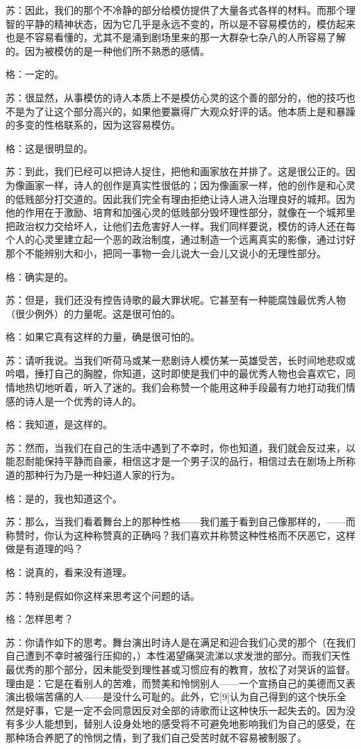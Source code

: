 \documentclass[12pt,oneside]{book}
\begin{document}
苏：因此，我们的那个不冷静的部分给模仿提供了大量各式各样的材料。而那个理智的平静的精神状态，因为它几乎是永远不变的，所以是不容易模仿的，模仿起来也是不容易看懂的，尤其不是涌到剧场里来的那一大群杂七杂八的人所容易了解的。因为被模仿的是一种他们所不熟悉的感情。

格：一定的。

苏：很显然，从事模仿的诗人本质上不是模仿心灵的这个善的部分的，他的技巧也不是为了让这个部分高兴的，如果他要赢得广大观众好评的话。他本质上是和暴躁的多变的性格联系的，因为这容易模仿。

格：这是很明显的。

苏：到此，我们已经可以把诗人捉住，把他和画家放在并排了。这是很公正的。因为像画家一样，诗人的创作是真实性很低的；因为像画家一样，他的创作是和心灵的低贱部分打交道的。因此我们完全有理由拒绝让诗人进入治理良好的城邦。因为他的作用在于激励、培育和加强心灵的低贱部分毁坏理性部分，就像在一个城邦里把政治权力交给坏人，让他们去危害好人一样。我们同样要说，模仿的诗人还在每个人的心灵里建立起一个恶的政治制度，通过制造一个远离真实的影像，通过讨好那个不能辨别大和小，把同一事物一会儿说大一会儿又说小的无理性部分。

格：确实是的。

苏：但是，我们还没有控告诗歌的最大罪状呢。它甚至有一种能腐蚀最优秀人物（很少例外）的力量呢。这是很可怕的。

格：如果它真有这样的力量，确是很可怕的。

苏：请听我说。当我们听荷马或某一悲剧诗人模仿某一英雄受苦，长时间地悲叹或吟唱，捶打自己的胸膛，你知道，这时即使是我们中的最优秀人物也会喜欢它，同情地热切地听着，听入了迷的。我们会称赞一个能用这种手段最有力地打动我们情感的诗人是一个优秀的诗人的。

格：我知道，是这样的。

苏：然而，当我们在自己的生活中遇到了不幸时，你也知道，我们就会反过来，以能忍耐能保持平静而自豪，相信这才是一个男子汉的品行，相信过去在剧场上所称道的那种行为乃是一种妇道人家的行为。

格：是的，我也知道这个。

苏：那么，当我们看着舞台上的那种性格——我们羞于看到自己像那样的，——而称赞时，你认为这种称赞真的正确吗？我们喜欢并称赞这种性格而不厌恶它，这样做是有道理的吗？

格：说真的，看来没有道理。

苏：特别是假如你这样来思考这个问题的话。

格：怎样思考？

苏：你请作如下的思考。舞台演出时诗人是在满足和迎合我们心灵的那个（在我们自己遭到不幸时被强行压抑的，）本性渴望痛哭流涕以求发泄的部分。而我们天性最优秀的那个部分，因未能受到理性甚或习惯应有的教育，放松了对哭诉的监督。理由是：它是在看别人的苦难，而赞美和怜悯别人——一个宣扬自己的美德而又表演出极端苦痛的人——是没什么可耻的。此外，它[9]认为自己得到的这个快乐全然是好事，它是一定不会同意因反对全部的诗歌而让这种快乐一起失去的。因为没有多少人能想到，替别人设身处地的感受将不可避免地影响我们为自己的感受，在那种场合养肥了的怜悯之情，到了我们自己受苦时就不容易被制服了。
\end{document}
